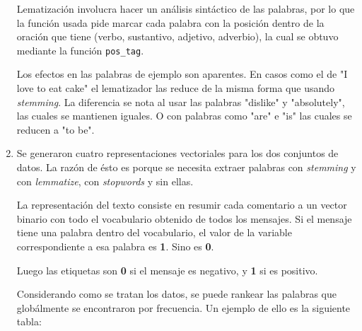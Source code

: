 \documentclass[11pt,letterpaper]{article}
\begin{document}
\begin{enumerate}
Lematización involucra hacer un análisis sintáctico de las palabras, por lo
que la función usada pide marcar cada palabra con la posición dentro de la
oración que tiene (verbo, sustantivo, adjetivo, adverbio), la cual se
obtuvo mediante la función \texttt{pos\_tag}.

Los efectos en las palabras de ejemplo son aparentes. En casos como el de
"I love to eat cake" el lematizador las reduce de la misma forma que usando
\emph{stemming}. La diferencia se nota al usar las palabras "dislike" y
"absolutely", las cuales se mantienen iguales. O con palabras como "are" e
"is" las cuales se reducen a "to be".
\item Se generaron cuatro representaciones vectoriales para los dos conjuntos de
datos. La razón de ésto es porque se necesita extraer palabras con
\emph{stemming} y con \emph{lemmatize}, con \emph{stopwords} y sin ellas.

La representación del texto consiste en resumir cada comentario a un vector
binario con todo el vocabulario obtenido de todos los mensajes. Si el
mensaje tiene una palabra dentro del vocabulario, el valor de la variable
correspondiente a esa palabra es \textbf{1}. Sino es \textbf{0}. 

Luego las etiquetas son \textbf{0} si el mensaje es negativo, y \textbf{1} si es
positivo.

Considerando como se tratan los datos, se puede rankear las palabras que
globálmente se encontraron por frecuencia. Un ejemplo de ello es la
siguiente tabla:


\end{enumerate}
\end{document}
